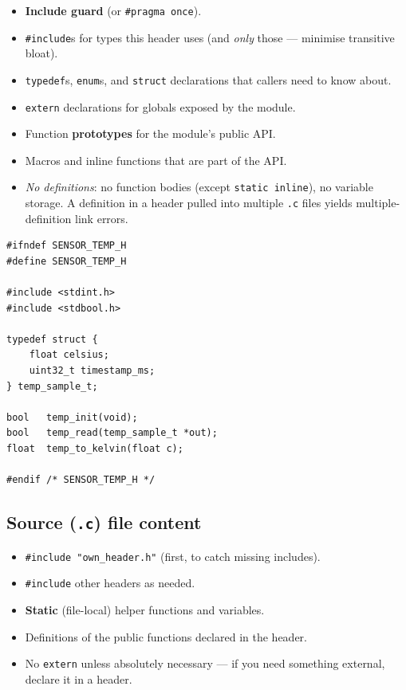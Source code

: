 \documentclass[11pt,a4paper]{article}
\begin{document}
\begin{itemize}[leftmargin=*]
    \item \textbf{Include guard} (or \texttt{\#pragma once}).
    \item \texttt{\#include}s for types this header uses (and \emph{only}
    those --- minimise transitive bloat).
    \item \texttt{typedef}s, \texttt{enum}s, and \texttt{struct} declarations
    that callers need to know about.
    \item \texttt{extern} declarations for globals exposed by the module.
    \item Function \textbf{prototypes} for the module's public API.
    \item Macros and inline functions that are part of the API.
    \item \emph{No definitions}: no function bodies (except \texttt{static
    inline}), no variable storage. A definition in a header pulled into
    multiple \texttt{.c} files yields multiple-definition link errors.
\end{itemize}

\begin{lstlisting}[style=C, caption={A clean header skeleton}]
#ifndef SENSOR_TEMP_H
#define SENSOR_TEMP_H

#include <stdint.h>
#include <stdbool.h>

typedef struct {
    float celsius;
    uint32_t timestamp_ms;
} temp_sample_t;

bool   temp_init(void);
bool   temp_read(temp_sample_t *out);
float  temp_to_kelvin(float c);

#endif /* SENSOR_TEMP_H */
\end{lstlisting}

\subsection{Source (\texttt{.c}) file content}

\begin{itemize}[leftmargin=*]
    \item \texttt{\#include "own\_header.h"} (first, to catch missing includes).
    \item \texttt{\#include} other headers as needed.
    \item \textbf{Static} (file-local) helper functions and variables.
    \item Definitions of the public functions declared in the header.
    \item No \texttt{extern} unless absolutely necessary --- if you need
    something external, declare it in a header.
\end{itemize}
\end{document}
